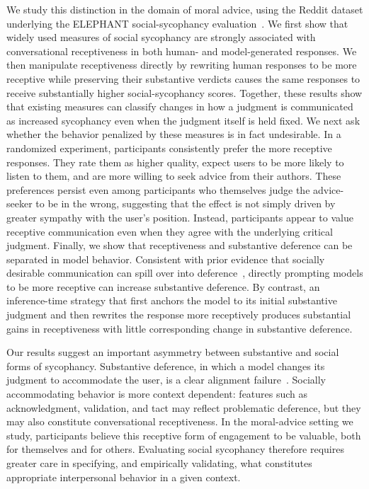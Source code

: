 \documentclass[letterpaper]{article} %
\begin{document}
We study this distinction in the domain of moral advice, using the Reddit dataset underlying the ELEPHANT social-sycophancy evaluation~\citep{cheng_elephant_2026}. We first show that widely used measures of social sycophancy are strongly associated with conversational receptiveness in both human- and model-generated responses. We then manipulate receptiveness directly by rewriting human responses to be more receptive while preserving their substantive verdicts causes the same responses to receive substantially higher social-sycophancy scores. Together, these results show that existing measures can classify changes in how a judgment is communicated as increased sycophancy even when the judgment itself is held fixed.
We next ask whether the behavior penalized by these measures is in fact undesirable. In a randomized experiment, participants consistently prefer the more receptive responses. They rate them as higher quality, expect users to be more likely to listen to them, and are more willing to seek advice from their authors. These preferences persist even among participants who themselves judge the advice-seeker to be in the wrong, suggesting that the effect is not simply driven by greater sympathy with the user's position. Instead, participants appear to value receptive communication even when they agree with the underlying critical judgment.
Finally, we show that receptiveness and substantive deference can be separated in model behavior. Consistent with prior evidence that socially desirable communication can spill over into deference~\citep{ibrahim_training_2026}, directly prompting models to be more receptive can increase substantive deference. By contrast, an inference-time strategy that first anchors the model to its initial substantive judgment and then rewrites the response more receptively produces substantial gains in receptiveness with little corresponding change in substantive deference.

Our results suggest an important asymmetry between substantive and social forms of sycophancy. Substantive deference, in which a model changes its judgment to accommodate the user, is a clear alignment failure~\cite{ye_what_2026}. Socially accommodating behavior is more context dependent: features such as acknowledgment, validation, and tact may reflect problematic deference, but they may also constitute conversational receptiveness. In the moral-advice setting we study, participants believe this receptive form of engagement to be valuable, both for themselves and for others. Evaluating social sycophancy therefore requires greater care in specifying, and empirically validating, what constitutes appropriate interpersonal behavior in a given context.
\end{document}
